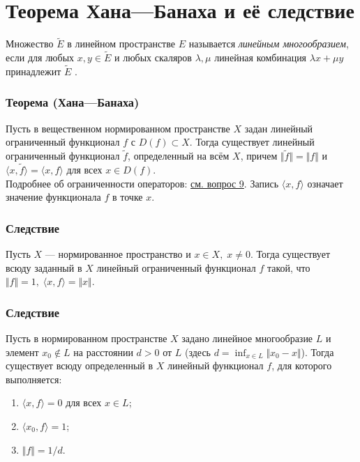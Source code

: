 \section{Теорема Хана---Банаха и её следствие}
Множество $\widetilde{E}$ в линейном пространстве $E$ называется \textit{линейным многообразием}, если для любых $x, y \in \widetilde{E}$ и любых скаляров $\lambda, \mu$ линейная комбинация $\lambda x + \mu y$ принадлежит $\widetilde{E}$ \cite[с.~13]{trenogin}.

\subsubsection*{Теорема (Хана---Банаха)}
Пусть в вещественном нормированном пространстве $X$ задан линейный ограниченный функционал $f$ с $D(f) \subset X$. Тогда существует линейный ограниченный функционал $\tilde{f}$, определенный на всём $X$, причем $\Vert \tilde{f} \Vert = \Vert f \Vert$ и $\langle x,\tilde{f}\rangle = \langle x,f \rangle$ для всех $x \in D(f)$\cite[с.~163]{trenogin}.\\
Подробнее об ограниченности операторов: \hyperref[sec:q-9]{см. вопрос 9}. Запись $\langle x,f \rangle$ означает значение функционала $f$ в точке $x$.

\subsubsection*{Следствие}
Пусть $X$ --- нормированное пространство и $x \in X,\;x\neq 0$. Тогда существует всюду заданный в $X$ линейный ограниченный функционал $f$ такой, что $\Vert f \Vert = 1,\; \langle x, f \rangle = \Vert x \Vert$\cite[с.~167]{trenogin}.

\subsubsection*{Следствие}
Пусть в нормированном пространстве $X$ задано линейное многообразие $L$ и элемент $x_0 \notin L$ на расстоянии $d > 0$ от $L$ (здесь $\displaystyle d = \inf_{x \in L}\Vert x_0 - x \Vert$). Тогда существует всюду определенный в $X$ линейный функционал $f$, для которого выполняется\cite[с.~167]{trenogin}:
\begin{enumerate}
	\itemsep0em
	\item $\langle x, f \rangle = 0$ для всех $x \in L$;
	\item $\langle x_0, f \rangle = 1$;
	\item $\Vert f \Vert = 1 / d$.
\end{enumerate}

